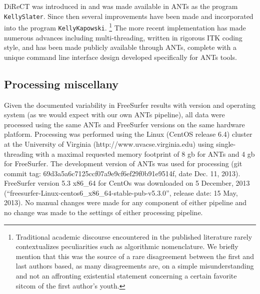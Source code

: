 DiReCT was introduced 
in \cite{das2009} and was made available in ANTs as the program \verb#KellySlater#.
Since then several improvements have been made and incorporated into the program
\verb#KellyKapowski#.%
\footnote{
Traditional academic discourse encountered in the published literature
rarely contextualizes peculiarities such as algorithmic nomenclature.
We briefly mention that
this was the source of a rare disagreement between the first and last authors
based, as many disagreements are, on a simple misunderstanding and not an
affronting existential statement concerning a certain favorite sitcom
of the first author's youth. 
}
The more recent implementation has made numerous advances including
multi-threading, written in rigorous ITK coding style,%
 and
has been made publicly available through ANTs, complete with a unique command line
interface design developed specifically for ANTs tools.

\subsection{Processing miscellany}

Given the documented variability in FreeSurfer results with version and
operating system \citep{gronenschild2012} (as we would expect with our own ANTs pipeline),
all data were processed using the same ANTs and FreeSurfer versions on the same 
hardware platform.  Processing was performed using the Linux (CentOS release 6.4) 
cluster at the University 
of Virginia (http://www.uvacse.virginia.edu)
using single-threading with a maximal requested memory footprint of 8 gb for ANTs 
and 4 gb for FreeSurfer.  The development version of ANTs was used for processing 
(git commit tag: 69d3a5a6c7125ccf07a9e9cf6ef29f0b91e9514f, date Dec. 11, 2013).  
FreeSurfer version 5.3 x86\_64 for CentOs was downloaded 
on 5 December, 2013 (``freesurfer-Linux-centos6\_x86\_64-stable-pub-v5.3.0'', release
date: 15 May, 2013).   {\color{blue}{The brain extraction and segmentation results from both 
pipelines were visually inspected to screen for major problems.}}
No manual changes were made for any component of either pipeline and no change was made to the settings of either processing pipeline.



